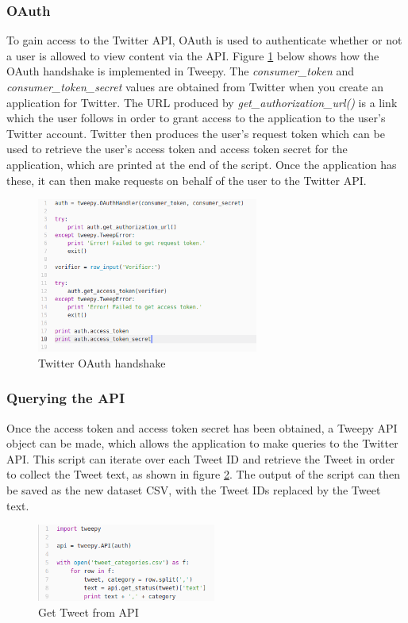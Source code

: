 \subsubsection{OAuth}
To gain access to the Twitter API, OAuth is used to authenticate whether or not a user is allowed to view content via the API. Figure \ref{fig:oauth} below shows how the OAuth handshake is implemented in Tweepy. The \textit{consumer\_token} and \textit{consumer\_token\_secret} values are obtained from Twitter when you create an application for Twitter. The URL produced by \textit{get\_authorization\_url()} is a link which the user follows in order to grant access to the application to the user's Twitter account. Twitter then produces the user's request token which can be used to retrieve the user's access token and access token secret for the application, which are printed at the end of the script. Once the application has these, it can then make requests on behalf of the user to the Twitter API.

\begin{figure}[H]
	\centering
	\includegraphics[height=2in]{Images/Implementation/oauth}
	\caption{Twitter OAuth handshake} \label{fig:oauth}
\end{figure}

\subsubsection{Querying the API}
Once the access token and access token secret has been obtained, a Tweepy API object can be made, which allows the application to make queries to the Twitter API. This script can iterate over each Tweet ID and retrieve the Tweet in order to collect the Tweet text, as shown in figure \ref{fig:get-tweets}. The output of the script can then be saved as the new dataset CSV, with the Tweet IDs replaced by the Tweet text.

\begin{figure}[H]
	\centering
	\includegraphics[height=1in]{Images/Implementation/get-tweets}
	\caption{Get Tweet from API} \label{fig:get-tweets}
\end{figure}

